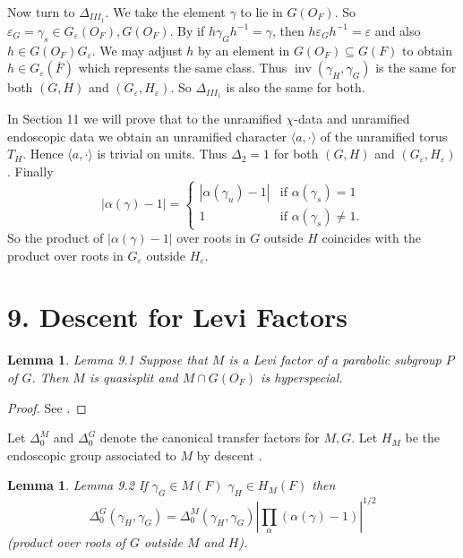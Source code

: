 \documentclass[11pt]{amsart}
\theoremstyle{plain}
\newtheorem{lemma}[theorem]{Lemma}
\theoremstyle{definition}
\def\varep{\varepsilon}
\def\KOTTWITZS{16}
\def\LANGLANDSD{22}
\begin{document}
Now turn to $\Delta_{III_1}$.  We take the element
$\gamma$ to lie in $G(O_F)$.  So
$\varep_G=\gamma_s\in G_\varep(O_F),G(O_F)$.
By \cite {\KOTTWITZS} if $h\gamma_Gh^{-1}=\gamma$,
then $h\varep_Gh^{-1}=\varep$ and also
$h\in G(O_F)G_\varep$.  We may adjust $h$ by
an element in $G(O_F)\subseteq G(F)$ to obtain
$h\in G_\varep(\overline F)$ which represents the
same class.  Thus $\operatorname{inv}(\gamma_H,\gamma_G)$
is the same for both $(G,H)$ and $(G_\varep,H_{\varep})$.
So $\Delta_{III_1}$ is also the same for both.

In Section 11 we will prove that to the unramified $\chi$-data and unramified
endoscopic data we obtain an unramified character
$\langle a,\cdot \rangle$ of the unramified torus
$T_H$.  Hence $\langle a,\cdot \rangle$ is
trivial on units.  Thus
$\Delta_2=1$ for both $(G,H)$ and $(G_\varep,H_\varep)$.
Finally
$$
|\alpha(\gamma)-1|
=\begin{cases}
|\alpha(\gamma_u)-1| &\text{if }\alpha(\gamma_s)=1\\
1 & \text{if }\alpha(\gamma_s) \ne 1.
\end{cases}
$$
So the product of $|\alpha(\gamma)-1|$ over
roots in $G$ outside $H$ coincides with the 
product over roots in $G_\varep$ outside $H_\varep$.

\section{9.  Descent for Levi Factors}

\begin{lemma}{Lemma 9.1}  Suppose that $M$ is a
Levi factor of a parabolic subgroup $P$ of $G$.
Then $M$  is quasisplit and $M\cap G(O_F)$ is hyperspecial.
\end{lemma}

\begin{proof}  See \cite{\KOTTWITZS}. \end{proof}

Let $\Delta_0^M$ and $\Delta_0^G$ denote
the canonical transfer factors for $M,G$.  Let $H_M$ be the endoscopic
group associated to $M$ by descent \cite{\LANGLANDSD}.

\begin{lemma}{Lemma 9.2}  If $\gamma_G\in M(F)$
$\gamma_H\in H_M(F)$ then
$$
\Delta_0^G(\gamma_H,\gamma_G)
=\Delta_0^M(\gamma_H,\gamma_G)
|\prod_\alpha(\alpha(\gamma)-1)|^{1/2}
$$
(product over roots of $G$ outside $M$ and $H$).
\end{lemma}
\end{document}
